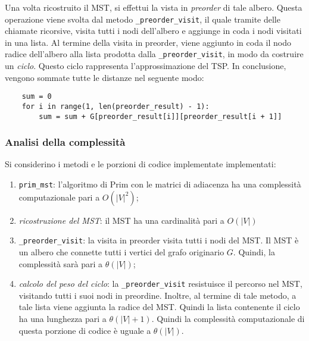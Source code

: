 Una volta ricostruito il MST, si effettui la vista in \textit{preorder} di tale albero. 
Questa operazione viene svolta dal metodo \verb|_preorder_visit|, il quale tramite 
delle chiamate ricorsive, visita tutti i nodi dell'albero e aggiunge in coda i nodi 
visitati in una lista. Al termine della visita in preorder, viene aggiunto in coda 
il nodo radice dell'albero alla lista prodotta dalla \verb|_preorder_visit|, in modo da 
costruire un \textit{ciclo}. Questo ciclo rappresenta l'approssimazione del TSP. 
In conclusione, vengono sommate tutte le distanze nel seguente modo:
\begin{verbatim}
    sum = 0
    for i in range(1, len(preorder_result) - 1):
        sum = sum + G[preorder_result[i]][preorder_result[i + 1]]
\end{verbatim}

\subsubsection{Analisi della complessità}

Si considerino i metodi e le porzioni di codice implementate implementati:
\begin{enumerate}
    \item \verb|prim_mst|: l'algoritmo di Prim con le matrici di adiacenza ha una complessità 
    computazionale pari a $O(|V|^2)$;
    \item \textit{ricostruzione del MST}: il MST ha una cardinalità pari a $O(|V|)$
    \item \verb|_preorder_visit|: la visita in preorder visita tutti i nodi del MST. Il MST 
    è un albero che connette tutti i vertici del grafo originario $G$. Quindi, la 
    complessità sarà pari a $\theta(|V|)$;
    \item \textit{calcolo del peso del ciclo}: la \verb|_preorder_visit| resistuisce il 
    percorso nel MST, visitando tutti i suoi nodi in preordine. Inoltre, al termine di 
    tale metodo, a tale lista viene aggiunta la radice del MST. Quindi la lista contenente 
    il ciclo ha una lunghezza pari a $\theta(|V| + 1)$. Quindi la complessità computazionale 
    di questa porzione di codice è uguale a $\theta(|V|)$.
\end{enumerate}